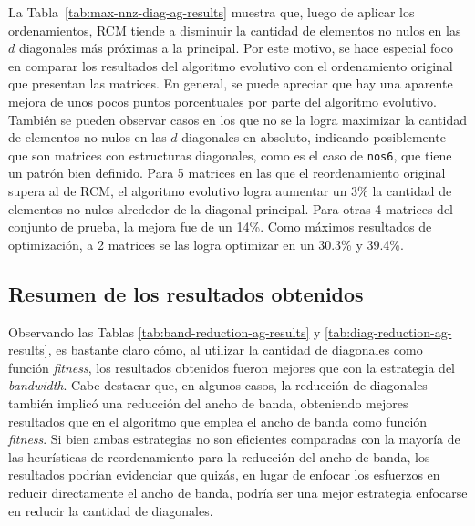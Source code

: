 La Tabla~\ref{tab:max-nnz-diag-ag-results} muestra que, luego de aplicar los ordenamientos, RCM tiende a disminuir la cantidad de elementos no nulos en las $d$ diagonales más próximas a la principal.
Por este motivo, se hace especial foco en comparar los resultados del algoritmo evolutivo con el ordenamiento original que presentan las matrices. En general, se puede apreciar que hay una aparente mejora de unos pocos puntos porcentuales por parte del algoritmo evolutivo. También se pueden observar casos en los que no se la logra maximizar la cantidad de elementos no nulos en las $d$  diagonales en absoluto, indicando posiblemente que son matrices con estructuras diagonales, como es el caso de \texttt{nos6}, que tiene un patrón bien definido. Para 5 matrices en las que el reordenamiento original supera al de RCM, el algoritmo evolutivo logra aumentar un 3\% la cantidad de elementos no nulos alrededor de la diagonal principal. Para otras 4 matrices del conjunto de prueba, la mejora fue de un 14\%. Como máximos resultados de optimización, a 2 matrices se las logra optimizar en un 30.3\% y 39.4\%.


\subsection{Resumen de los resultados obtenidos}


Observando las Tablas \ref{tab:band-reduction-ag-results} y \ref{tab:diag-reduction-ag-results}, es bastante claro cómo, al utilizar la cantidad de diagonales como función \textit{fitness}, los resultados obtenidos fueron mejores que con la estrategia del \textit{bandwidth}. Cabe destacar que, %
en algunos casos, %
la reducción de diagonales también implicó una reducción del ancho de banda, obteniendo mejores resultados que en el algoritmo que emplea el ancho de banda como función \textit{fitness}. Si bien ambas estrategias no son eficientes comparadas con la mayoría de las heurísticas de reordenamiento para la reducción del ancho de banda, los resultados podrían evidenciar que quizás, en lugar de enfocar los esfuerzos en reducir directamente el ancho de banda, podría ser una mejor estrategia enfocarse en reducir la cantidad de diagonales.

